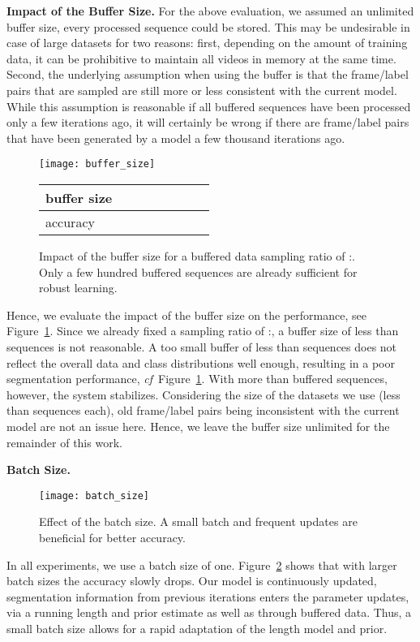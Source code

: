 \documentclass[10pt,twocolumn,letterpaper]{article}
\def\cf{\emph{cf}\onedot} \def\Cf{\emph{Cf}\onedot}
\begin{document}
\textbf{Impact of the Buffer Size.}
For the above evaluation, we assumed an unlimited buffer size, \ie every processed sequence
could be stored. This may be undesirable in case of large datasets for two reasons:
first, depending on the amount of training data, it can be prohibitive to maintain all videos
in memory at the same time. Second, the underlying assumption when using the buffer is that
the frame/label pairs that are sampled are still more or less consistent with the current
model. While this assumption is reasonable if all buffered sequences have been processed
only a few iterations ago, it will certainly be wrong if there are frame/label pairs that
have been generated by a model a few thousand iterations ago. 
\begin{figure}[tb]
    \centering
    \texttt{[image: buffer\_size]}
    \footnotesize
    \begin{tabularx}{0.48\textwidth}{Xr@{\hskip 1.7ex}r@{\hskip 1.7ex}r@{\hskip 1.7ex}r@{\hskip 1.7ex}r@{\hskip 1.7ex}r@{\hskip 1.7ex}r}
        \toprule
            buffer size      &    &    &   &   &   &  &  \\
        \midrule
            accuracy         &  &  &  &  &  &  &    \\
        \bottomrule
    \end{tabularx}
    \caption{Impact of the buffer size for a buffered data sampling ratio of :. Only a few hundred buffered
             sequences are already sufficient for robust learning.}
    \label{fig:bufferSize}
\end{figure}
Hence, we evaluate the impact of the buffer size on the performance, see Figure~\ref{fig:bufferSize}.
Since we already fixed a sampling ratio of :, a buffer size of less than  sequences
is not reasonable. A too small buffer of less than  sequences does
not reflect the overall data and class distributions well enough, resulting in a poor segmentation
performance, \cf~Figure~\ref{fig:bufferSize}.
With more than  buffered sequences, however, the system stabilizes.
Considering the size of the datasets we use (less than  sequences each), old frame/label
pairs being inconsistent with the current model are not an issue here. Hence, we leave the buffer size unlimited for the remainder of this work.

\textbf{Batch Size.}
\begin{figure}[tb]
    \centering
    \texttt{[image: batch\_size]}
    \caption{Effect of the batch size. A small batch and frequent updates are beneficial for better accuracy.}
    \label{fig:batchSize}
\end{figure}
In all experiments, we use a batch size of one. Figure~\ref{fig:batchSize} shows that with larger batch
sizes the accuracy slowly drops. Our model is continuously updated, \ie segmentation information from
previous iterations enters the parameter updates, via a running length and prior estimate as well as through
buffered data. Thus, a small batch size allows for a rapid adaptation of the length model and prior.
\end{document}
